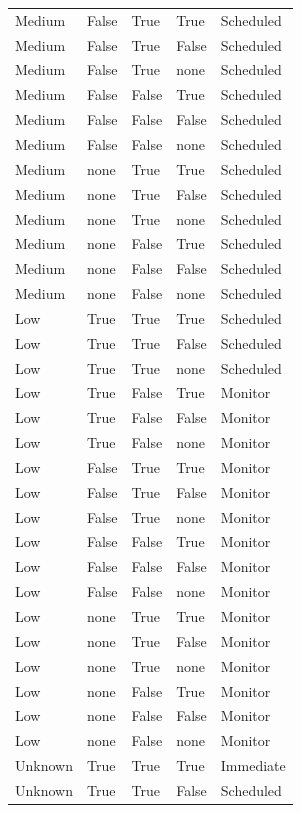 \begin{longtable}{@{}lllll@{}}
Medium & False & True & True & Scheduled \\
Medium & False & True & False & Scheduled \\
Medium & False & True & none & Scheduled \\
Medium & False & False & True & Scheduled \\
Medium & False & False & False & Scheduled \\
Medium & False & False & none & Scheduled \\
Medium & none & True & True & Scheduled \\
Medium & none & True & False & Scheduled \\
Medium & none & True & none & Scheduled \\
Medium & none & False & True & Scheduled \\
Medium & none & False & False & Scheduled \\
Medium & none & False & none & Scheduled \\
Low & True & True & True & Scheduled \\
Low & True & True & False & Scheduled \\
Low & True & True & none & Scheduled \\
Low & True & False & True & Monitor \\
Low & True & False & False & Monitor \\
Low & True & False & none & Monitor \\
Low & False & True & True & Monitor \\
Low & False & True & False & Monitor \\
Low & False & True & none & Monitor \\
Low & False & False & True & Monitor \\
Low & False & False & False & Monitor \\
Low & False & False & none & Monitor \\
Low & none & True & True & Monitor \\
Low & none & True & False & Monitor \\
Low & none & True & none & Monitor \\
Low & none & False & True & Monitor \\
Low & none & False & False & Monitor \\
Low & none & False & none & Monitor \\
Unknown & True & True & True & Immediate \\
Unknown & True & True & False & Scheduled \\

\end{longtable}
